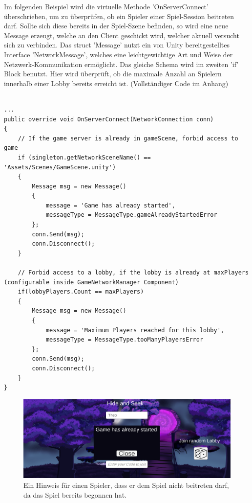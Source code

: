 Im folgenden Beispiel wird die virtuelle Methode 'OnServerConnect' überschrieben, um zu überprüfen, ob ein Spieler einer Spiel-Session beitreten darf. Sollte sich diese bereits in der Spiel-Szene befinden, so wird eine neue Message erzeugt, welche an den Client geschickt wird, welcher aktuell versucht sich zu verbinden. Das struct 'Message' nutzt ein von Unity bereitgestelltes Interface 'NetworkMessage', welches eine leichtgewichtige Art und Weise der Netzwerk-Kommunikation ermöglicht. Das gleiche Schema wird im zweiten 'if' Block benutzt. Hier wird überprüft, ob die maximale Anzahl an Spielern innerhalb einer Lobby bereits erreicht ist. (Vollständiger Code im Anhang)

\begin{lstlisting}[caption= GameNetworkManager.cs OnServerConnect() und Message struct]

...	
public override void OnServerConnect(NetworkConnection conn)
{
	// If the game server is already in gameScene, forbid access to game
	if (singleton.getNetworkSceneName() == 'Assets/Scenes/GameScene.unity')
	{
		Message msg = new Message()
		{
			message = 'Game has already started',
			messageType = MessageType.gameAlreadyStartedError
		};
		conn.Send(msg);
		conn.Disconnect();
	}
	
	// Forbid access to a lobby, if the lobby is already at maxPlayers (configurable inside GameNetworkManager Component)
	if(lobbyPlayers.Count == maxPlayers)
	{
		Message msg = new Message()
		{
			message = 'Maximum Players reached for this lobby',
			messageType = MessageType.tooManyPlayersError
		};
		conn.Send(msg);
		conn.Disconnect();
	}
}
\end{lstlisting}

\begin{figure}[H]
	\centering
	\includegraphics[width=120mm]{images/prototyp_game_has_already_started.png}
	\caption[Game has already started]{Ein Hinweis für einen Spieler, dass er dem Spiel nicht beitreten darf, da das Spiel bereits begonnen hat.}
	\label{pic:prototyp_game_has_already_started}
\end{figure}

